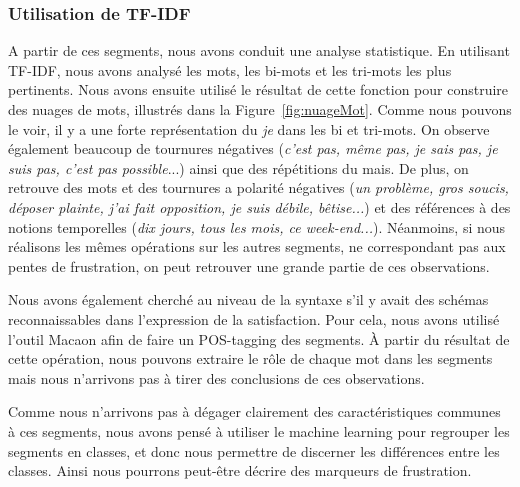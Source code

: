 \subsubsection{Utilisation de TF-IDF}



A partir de ces segments, nous avons conduit une analyse statistique. En utilisant TF-IDF, nous avons analysé les mots, les bi-mots et les tri-mots les plus pertinents. Nous avons ensuite utilisé le résultat de cette fonction pour construire des nuages de mots, illustrés dans la Figure~\ref{fig:nuageMot}. Comme nous pouvons le voir, il y a une forte représentation du \textit{je} dans les bi et tri-mots. On observe également beaucoup de tournures négatives (\textit{c'est pas, même pas, je sais pas, je suis pas, c'est pas possible}...) ainsi que des répétitions du mais. De plus, on retrouve des mots et des tournures a polarité négatives (\textit{un problème, gros soucis, déposer plainte, j'ai fait opposition, je suis débile, bêtise...}) et des références à des notions temporelles (\textit{dix jours, tous les mois, ce week-end...}). Néanmoins, si nous réalisons les mêmes opérations sur les autres segments, ne correspondant pas aux pentes de frustration, on peut retrouver une grande partie de ces observations.



Nous avons également cherché au niveau de la syntaxe s'il y avait des schémas reconnaissables dans l'expression de la satisfaction. Pour cela, nous avons utilisé l’outil Macaon afin de faire un POS-tagging des segments. À partir du résultat de cette opération, nous pouvons extraire le rôle de chaque mot dans les segments mais nous n'arrivons pas à tirer des conclusions de ces observations. %

%

Comme nous n'arrivons pas à dégager clairement des caractéristiques communes à ces segments, nous avons pensé à utiliser le machine learning pour regrouper les segments en classes, et donc nous permettre de discerner les différences entre les classes. Ainsi nous pourrons peut-être décrire des marqueurs de frustration.

